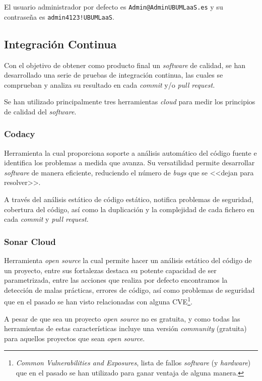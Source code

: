 El usuario administrador por defecto es \texttt{Admin@AdminUBUMLaaS.es} y su contraseña es \texttt{admin4123!UBUMLaaS}.

\subsection{Integración Continua}
Con el objetivo de obtener como producto final un \textit{software} de calidad, se han desarrollado una serie de pruebas de integración continua, las cuales se comprueban y analiza su resultado en cada \textit{commit} y/o \textit{pull request.}

Se han utilizado principalmente tres herramientas \textit{cloud} para medir los principios de calidad del \textit{software}.

\subsubsection{Codacy}
Herramienta la cual proporciona soporte a análisis automático del código fuente e identifica los problemas a medida que avanza. Su versatilidad permite desarrollar \textit{software} de manera eficiente, reduciendo el número de \textit{bugs} que se <<dejan para resolver>>. 

A través del análisis estático de código estático, notifica problemas de seguridad, cobertura del código, así como la duplicación y la complejidad de cada fichero en cada \textit{commit} y \textit{pull request}.


\subsubsection{Sonar Cloud}
Herramienta \textit{open source} la cual permite hacer un análisis estático del código de un proyecto, entre sus fortalezas destaca su potente capacidad de ser parametrizada, entre las acciones que realiza por defecto encontramos la detección de malas prácticas, errores de código, así como problemas de seguridad que en el pasado se han visto relacionadas con alguna CVE\footnote{\textit{Common Vulnerabilities and Exposures}, lista de fallos \textit{software} (y \textit{hardware}) que en el pasado se han utilizado para ganar ventaja de alguna manera.}.

A pesar de que sea un proyecto \textit{open source} no es gratuita, y como todas las herramientas de estas características incluye una versión \textit{community} (gratuita) para aquellos proyectos que sean \textit{open source}.

